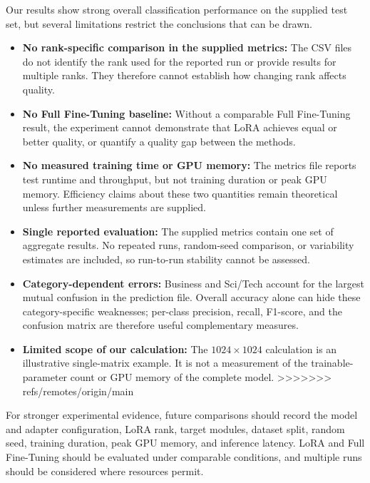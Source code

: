 Our results show strong overall classification performance
on the supplied test set, but several limitations restrict the
conclusions that can be drawn.

\begin{itemize}
	\item \textbf{No rank-specific comparison in the supplied
		      metrics:} The CSV files do not identify the rank used for the
	      reported run or provide results for multiple ranks. They
	      therefore cannot establish how changing rank affects quality.

	\item \textbf{No Full Fine-Tuning baseline:} Without a
	      comparable Full Fine-Tuning result, the experiment cannot
	      demonstrate that LoRA achieves equal or better quality, or
	      quantify a quality gap between the methods.

	\item \textbf{No measured training time or GPU memory:}
	      The metrics file reports test runtime and throughput, but
	      not training duration or peak GPU memory. Efficiency claims
	      about these two quantities remain theoretical unless further
	      measurements are supplied.

	\item \textbf{Single reported evaluation:} The supplied
	      metrics contain one set of aggregate results. No repeated
	      runs, random-seed comparison, or variability estimates are
	      included, so run-to-run stability cannot be assessed.

	\item \textbf{Category-dependent errors:} Business and
	      Sci/Tech account for the largest mutual confusion in the
	      prediction file. Overall accuracy alone can hide these
	      category-specific weaknesses; per-class precision, recall,
	      F1-score, and the confusion matrix are therefore useful
	      complementary measures.

	\item \textbf{Limited scope of our calculation:}
	      The $1024 \times 1024$ calculation is an illustrative
	      single-matrix example. It is not a measurement of the
	      trainable-parameter count or GPU memory of the complete
	      model.
	      >>>>>>> refs/remotes/origin/main
\end{itemize}

For stronger experimental evidence, future comparisons should
record the model and adapter configuration, LoRA rank, target
modules, dataset split, random seed, training duration, peak
GPU memory, and inference latency. LoRA and Full Fine-Tuning
should be evaluated under comparable conditions, and multiple
runs should be considered where resources permit.

